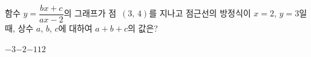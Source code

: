 함수 $y=\dfrac{bx+c}{ax-2}$의 그래프가 점~$(3,\,4)$를 지나고 점근선의 방정식이 $x=2$, $y=3$일 때, 상수 $a$, $b$, $c$에 대하여 $a+b+c$의 값은?
\begin{choices32}{$-3$}{$-2$}{$-1$}{$1$}{$2$}\end{choices32}
